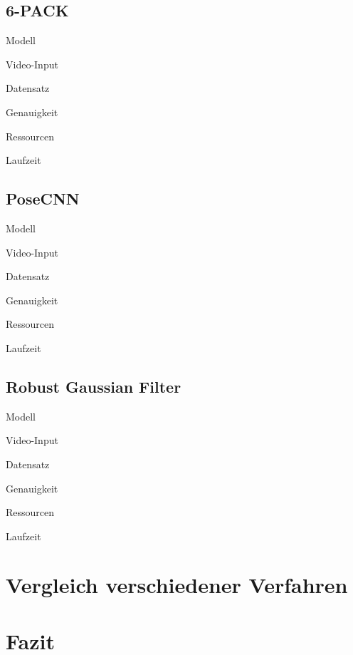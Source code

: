 \documentclass[a4paper, 11pt]{article}
\begin{document}
\begin{multicols*}{2}
    \subsection{6-PACK\cite{6pack}}
    \begin{description*}
        \item[Modell]
        \item[Video-Input]
        \item[Datensatz]
        \item[Genauigkeit]
        \item[Ressourcen]
        \item[Laufzeit]
    \end{description*}

    \subsection{PoseCNN\cite{PoseCNN}}
    \begin{description*}
        \item[Modell]
        \item[Video-Input]
        \item[Datensatz]
        \item[Genauigkeit]
        \item[Ressourcen]
        \item[Laufzeit]
    \end{description*}

    \subsection{Robust Gaussian Filter\cite{GaussianFilter}}
    \begin{description*}
        \item[Modell]
        \item[Video-Input]
        \item[Datensatz]
        \item[Genauigkeit]
        \item[Ressourcen]
        \item[Laufzeit]
    \end{description*}

    \section{Vergleich verschiedener Verfahren}

    \section{Fazit}

\end{multicols*}

\medskip

\printglossary[title=Glossar]

\printbibliography[title=Literatur]
\end{document}
